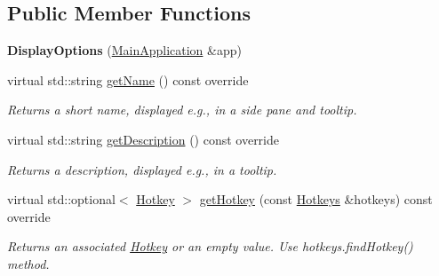 \subsection*{Public Member Functions}
\begin{DoxyCompactItemize}
\item 
\mbox{\label{classpepr3d_1_1_display_options_a139425e33e4e1ba7b85aae7ea288e926}} 
{\bfseries Display\+Options} (\mbox{\hyperlink{classpepr3d_1_1_main_application}{Main\+Application}} \&app)
\item 
\mbox{\label{classpepr3d_1_1_display_options_aa743b8c99fcabb4603c1d8c3357020f6}} 
virtual std\+::string \mbox{\hyperlink{classpepr3d_1_1_display_options_aa743b8c99fcabb4603c1d8c3357020f6}{get\+Name}} () const override
\begin{DoxyCompactList}\small\item\em Returns a short name, displayed e.\+g., in a side pane and tooltip. \end{DoxyCompactList}\item 
\mbox{\label{classpepr3d_1_1_display_options_aa68e8ddd00436caf8f3b5d4cab81f4cd}} 
virtual std\+::string \mbox{\hyperlink{classpepr3d_1_1_display_options_aa68e8ddd00436caf8f3b5d4cab81f4cd}{get\+Description}} () const override
\begin{DoxyCompactList}\small\item\em Returns a description, displayed e.\+g., in a tooltip. \end{DoxyCompactList}\item 
\mbox{\label{classpepr3d_1_1_display_options_ad81f1aa914b4b7f513d4d01995c4d60e}} 
virtual std\+::optional$<$ \mbox{\hyperlink{structpepr3d_1_1_hotkey}{Hotkey}} $>$ \mbox{\hyperlink{classpepr3d_1_1_display_options_ad81f1aa914b4b7f513d4d01995c4d60e}{get\+Hotkey}} (const \mbox{\hyperlink{classpepr3d_1_1_hotkeys}{Hotkeys}} \&hotkeys) const override
\begin{DoxyCompactList}\small\item\em Returns an associated \mbox{\hyperlink{structpepr3d_1_1_hotkey}{Hotkey}} or an empty value. Use hotkeys.\+find\+Hotkey() method. \end{DoxyCompactList}\item 
\mbox{\label{classpepr3d_1_1_display_options_a8f1a481272d7ebcc96c32937027be68c}} 

\end{DoxyCompactItemize}
